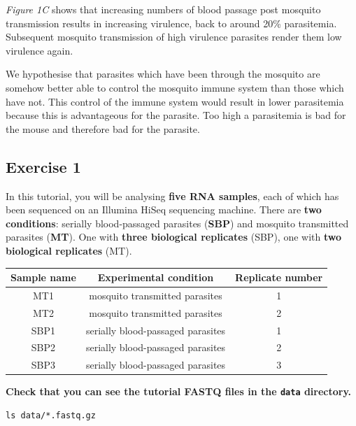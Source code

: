 \documentclass[11pt]{article}
\makeatletter
\newcommand{\boxspacing}{\kern\kvtcb@left@rule\kern\kvtcb@boxsep}
\newcommand{\prompt}[4]{
        \ttfamily\llap{{\color{#2}[#3]:\hspace{3pt}#4}}\vspace{-\baselineskip}
    }
\makeatother
\begin{document}
\textit{Figure 1C} shows that increasing numbers of blood passage post
mosquito transmission results in increasing virulence, back to around
20\% parasitemia. Subsequent mosquito transmission of high virulence
parasites render them low virulence again.

We hypothesise that parasites which have been through the mosquito are
somehow better able to control the mosquito immune system than those
which have not. This control of the immune system would result in lower
parasitemia because this is advantageous for the parasite. Too high a
parasitemia is bad for the mouse and therefore bad for the parasite.

\newpage

    \hypertarget{exercise-1}{%
\subsection{Exercise 1}\label{exercise-1}}

    In this tutorial, you will be analysing \textbf{five RNA samples}, each
of which has been sequenced on an Illumina HiSeq sequencing machine.
There are \textbf{two conditions}: serially blood-passaged parasites
(\textbf{SBP}) and mosquito transmitted parasites (\textbf{MT}). One
with \textbf{three biological replicates} (SBP), one with \textbf{two
biological replicates} (MT).

    \begin{longtable}[]{@{}ccc@{}}
\toprule
Sample name & Experimental condition & Replicate number\tabularnewline
\midrule
\endhead
MT1 & mosquito transmitted parasites & 1\tabularnewline
MT2 & mosquito transmitted parasites & 2\tabularnewline
SBP1 & serially blood-passaged parasites & 1\tabularnewline
SBP2 & serially blood-passaged parasites & 2\tabularnewline
SBP3 & serially blood-passaged parasites & 3\tabularnewline
\bottomrule
\end{longtable}

    \textbf{Check that you can see the tutorial FASTQ files in the
\texttt{data} directory.}

    \begin{tcolorbox}[breakable, size=fbox, boxrule=1pt, pad at break*=1mm,colback=cellbackground, colframe=cellborder]
\prompt{In}{incolor}{ }{\boxspacing}
\begin{Verbatim}[commandchars=\\\{\}]
ls data/*.fastq.gz
\end{Verbatim}
\end{tcolorbox}
\end{document}
